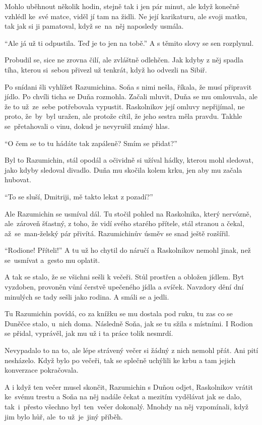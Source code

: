 \documentclass[11pt]{article}
\begin{document}
Mohlo uběhnout několik hodin, stejně tak i jen pár minut, ale když konečně vzhlédl ke~své matce, viděl jí tam na židli. Ne její karikaturu, ale svoji matku, tak jak si ji pamatoval, když se~na~něj naposledy usmála.

\enquote{Ale já už ti odpustila. Teď je to jen na tobě.} A s těmito slovy se sen rozplynul.

\hspace{1em}

Probudil se, sice ne zrovna čilí, ale zvláštně odlehčen. Jak kdyby z něj spadla tíha, kterou si~sebou přivezl už tenkrát, když ho odvezli na Sibiř.

Po snídani šli vyhlížet Razumichina. Soňa s nimi nešla, říkala, že musí připravit jídlo. Po chvíli ticha se Duňa rozmohla. Začali mluvit, Duňa se mu omlouvala, ale že to už~ze~sebe potřebovala vypustit. Raskolnikov její omluvy nepřijímal, ne proto, že~by~byl uražen, ale protože cítil, že jeho sestra měla pravdu. Takhle se~přetahovali o vinu, dokud je nevyrušil známý hlas.

\enquote{O čem se to tu hádáte tak zapáleně? Smím se přidat?}

Byl to Razumichin, stál opodál a očividně si užíval hádky, kterou mohl sledovat, jako kdyby sledoval divadlo. Duňa mu skočila kolem krku, jen aby mu začala hubovat.

\enquote{To se sluší, Dmitriji, mě takto lekat z pozadí?}

Ale Razumichin se usmíval dál. Tu stočil pohled na Raskolnika, který nervózně, ale~zároveň šťastný, z toho, že vidí svého starého přítele, stál stranou a čekal, až~se~man-želský pár přivítá. Razumichinův úsměv se snad ještě rozšířil.

\enquote{Rodione! Příteli!} A tu už ho chytil do náručí a Raskolnikov nemohl jinak, než se~usmívat a~gesto mu oplatit.

\hspace{1em}

A tak se stalo, že se všichni sešli k večeři. Stůl prostřen a obložen jídlem. Byt vyzdoben, provoněn vůní čerstvě upečeného jídla a svíček. Navzdory dění dní minulých se tady sešli jako rodina. A smáli se a jedli.

Tu Razumichin povídá, co za knížku se mu dostala pod ruku, tu zas co se Duněčce stalo, u~nich doma. Následně Soňa, jak se tu sžila s místními. I Rodion se přidal, vyprávěl, jak mu už i ta práce tolik nesmrdí.

Nevypadalo to na to, ale lépe strávený večer si žádný z nich nemohl přát. Ani pití nesházelo. Když bylo po večeři, tak se splečně uchýlili ke krbu a tam jejich konverzace pokračovala.

A i když ten večer musel skončit, Razumichin s Duňou odjet, Raskolnikov vrátit ke~svému trestu a Soňa na něj nadále čekat a mezitím vydělávat jak se dalo, tak~i~přesto všechno byl~ten~večer dokonalý. Mnohdy na něj vzpomínali, když jim bylo hůř, ale~to už~je~jiný příběh.
\end{document}
